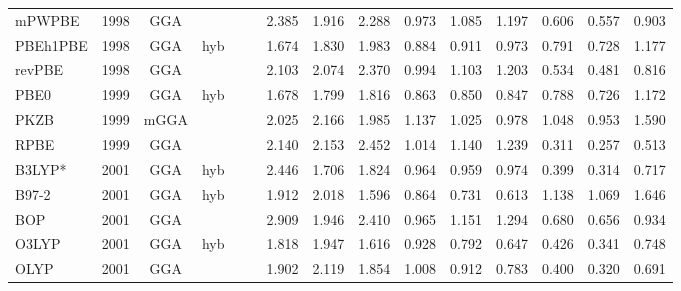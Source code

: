 \begin{landscape}
\begin{longtable}{lcccccrrrrrrrrr}
    mPWPBE           & 1998 & GGA  &          &             &           & 2.385             & 1.916             & 2.288  & 0.973              & 1.085             & 1.197  & 0.606   & 0.557 & 0.903 \\
    PBEh1PBE         & 1998 & GGA  & hyb      &             &           & 1.674             & 1.830             & 1.983  & 0.884              & 0.911             & 0.973  & 0.791   & 0.728 & 1.177 \\
    revPBE           & 1998 & GGA  &          &             &           & 2.103             & 2.074             & 2.370  & 0.994              & 1.103             & 1.203  & 0.534   & 0.481 & 0.816 \\
    PBE0             & 1999 & GGA  & hyb      &             &           & 1.678             & 1.799             & 1.816  & 0.863              & 0.850             & 0.847  & 0.788   & 0.726 & 1.172 \\
    PKZB             & 1999 & mGGA &          &             &           & 2.025             & 2.166             & 1.985  & 1.137              & 1.025             & 0.978  & 1.048   & 0.953 & 1.590 \\
    RPBE             & 1999 & GGA  &          &             &           & 2.140             & 2.153             & 2.452  & 1.014              & 1.140             & 1.239  & 0.311   & 0.257 & 0.513 \\
    B3LYP*           & 2001 & GGA  & hyb      &             &           & 2.446             & 1.706             & 1.824  & 0.964              & 0.959             & 0.974  & 0.399   & 0.314 & 0.717 \\
    B97-2            & 2001 & GGA  & hyb      &             &           & 1.912             & 2.018             & 1.596  & 0.864              & 0.731             & 0.613  & 1.138   & 1.069 & 1.646 \\
    BOP              & 2001 & GGA  &          &             &           & 2.909             & 1.946             & 2.410  & 0.965              & 1.151             & 1.294  & 0.680   & 0.656 & 0.934 \\
    O3LYP            & 2001 & GGA  & hyb      &             &           & 1.818             & 1.947             & 1.616  & 0.928              & 0.792             & 0.647  & 0.426   & 0.341 & 0.748 \\
    OLYP             & 2001 & GGA  &          &             &           & 1.902             & 2.119             & 1.854  & 1.008              & 0.912             & 0.783  & 0.400   & 0.320 & 0.691 \\

\end{longtable}
\end{landscape}
